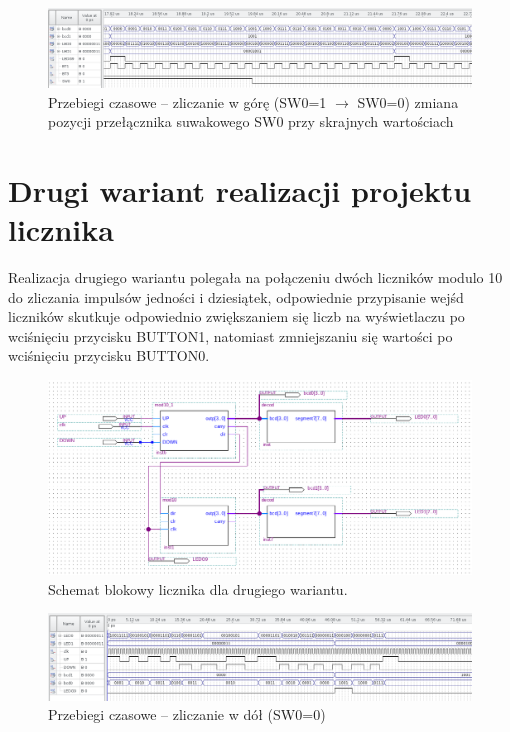 \documentclass{classrep}
\begin{document}
\begin{figure}[H]
	\centering
	\includegraphics[width=1.0\linewidth]{up_down_inv_2}
	\caption{Przebiegi czasowe – zliczanie w górę (SW0=1 $\longrightarrow$ SW0=0) zmiana pozycji przełącznika suwakowego SW0 przy skrajnych wartościach }
	\label{fig:symhex3}
\end{figure}

\section{ Drugi wariant realizacji projektu licznika}

Realizacja drugiego wariantu polegała na połączeniu dwóch liczników modulo 10 do zliczania
impulsów jedności i dziesiątek, odpowiednie przypisanie wejśd liczników skutkuje odpowiednio
zwiększaniem się liczb na wyświetlaczu po wciśnięciu przycisku BUTTON1, natomiast zmniejszaniu się
wartości po wciśnięciu przycisku BUTTON0.

\begin{figure}[H]  %
	\centering
	\includegraphics[width=1.0\linewidth]{blok1}  %
	\caption{ Schemat blokowy licznika dla drugiego wariantu. }
	\label{fig:block1}
\end{figure}



\begin{figure}[H]
	\centering
	\includegraphics[width=1.0\linewidth]{up_down_1_2}
	\caption{Przebiegi czasowe – zliczanie w dół (SW0=0)}
	\label{fig:symhex0}
\end{figure}
\end{document}
